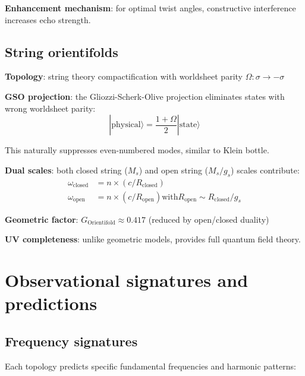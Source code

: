 \documentclass[12pt]{iopart}
\begin{document}
\textbf{Enhancement mechanism}: for optimal twist angles, constructive interference increases echo strength.

\subsection{String orientifolds}

\textbf{Topology}: string theory compactification with worldsheet parity $\Omega: \sigma \to -\sigma$

\textbf{GSO projection}: the Gliozzi-Scherk-Olive projection eliminates states with wrong worldsheet parity:
\begin{equation}
|\mathrm{physical}\rangle = \frac{1 + \Omega}{2} |\mathrm{state}\rangle
\end{equation}

This naturally suppresses even-numbered modes, similar to Klein bottle.

\textbf{Dual scales}: both closed string ($M_s$) and open string ($M_s/g_s$) scales contribute:
\begin{eqnarray}
\omega_{\mathrm{closed}} &= n \times (c/R_{\mathrm{closed}}) \\
\omega_{\mathrm{open}} &= n \times (c/R_{\mathrm{open}}) \mathrm{ with } R_{\mathrm{open}} \sim R_{\mathrm{closed}}/g_s
\end{eqnarray}

\textbf{Geometric factor}: $G_{\mathrm{Orientifold}} \approx 0.417$ (reduced by open/closed duality)

\textbf{UV completeness}: unlike geometric models, provides full quantum field theory.

\section{Observational signatures and predictions}

\subsection{Frequency signatures}

Each topology predicts specific fundamental frequencies and harmonic patterns:
\end{document}
